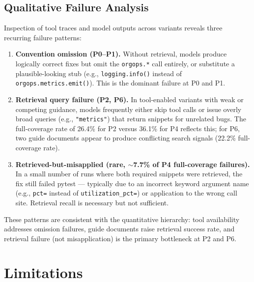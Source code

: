 \documentclass[10pt,a4paper,twocolumn]{article}
\begin{document}
\subsection{Qualitative Failure Analysis}
\label{sec:qualitative}

Inspection of tool traces and model outputs across variants reveals three
recurring failure patterns:

\begin{enumerate}
    \item \textbf{Convention omission (P0--P1).} Without retrieval,
    models produce logically correct fixes but omit the \texttt{orgops.*}
    call entirely, or substitute a plausible-looking stub (e.g.,
    \texttt{logging.info()} instead of \texttt{orgops.metrics.emit()}).
    This is the dominant failure at P0 and P1.

    \item \textbf{Retrieval query failure (P2, P6).} In tool-enabled
    variants with weak or competing guidance, models frequently either
    skip tool calls or issue overly broad queries (e.g.,
    \texttt{"metrics"}) that return snippets for unrelated bugs.
    The full-coverage rate of 26.4\% for P2 versus 36.1\% for P4
    reflects this; for P6, two guide documents appear to produce
    conflicting search signals (22.2\% full-coverage rate).

    \item \textbf{Retrieved-but-misapplied (rare, $\sim$7.7\% of P4
    full-coverage failures).} In a small number of runs where both
    required snippets were retrieved, the fix still failed pytest ---
    typically due to an incorrect keyword argument name (e.g.,
    \texttt{pct=} instead of \texttt{utilization\_pct=}) or application
    to the wrong call site. Retrieval recall is necessary but not
    sufficient.
\end{enumerate}

These patterns are consistent with the quantitative hierarchy: tool
availability addresses omission failures, guide documents raise retrieval
success rate, and retrieval failure (not misapplication) is the primary
bottleneck at P2 and P6.

\section{Limitations}
\label{sec:limitations}
\end{document}
